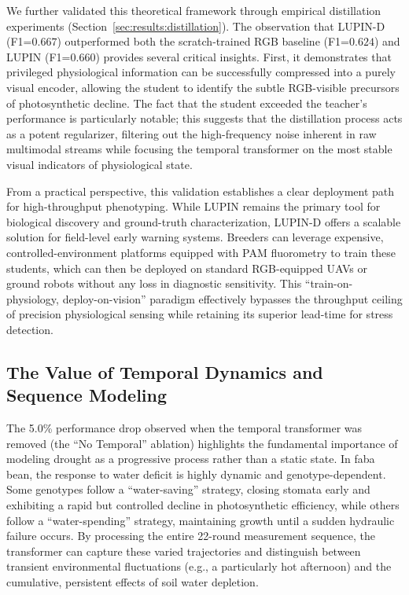 \documentclass[a4paper,fleqn]{cas-dc}
\begin{document}
We further validated this theoretical framework through empirical distillation experiments (Section~\ref{sec:results:distillation}). The observation that LUPIN-D (F1=$0.667$) outperformed both the scratch-trained RGB baseline (F1=$0.624$) and LUPIN (F1=$0.660$) provides several critical insights. First, it demonstrates that privileged physiological information can be successfully compressed into a purely visual encoder, allowing the student to identify the subtle RGB-visible precursors of photosynthetic decline. The fact that the student exceeded the teacher's performance is particularly notable; this suggests that the distillation process acts as a potent regularizer, filtering out the high-frequency noise inherent in raw multimodal streams while focusing the temporal transformer on the most stable visual indicators of physiological state.

From a practical perspective, this validation establishes a clear deployment path for high-throughput phenotyping. While LUPIN remains the primary tool for biological discovery and ground-truth characterization, LUPIN-D offers a scalable solution for field-level early warning systems. Breeders can leverage expensive, controlled-environment platforms equipped with PAM fluorometry to train these students, which can then be deployed on standard RGB-equipped UAVs or ground robots without any loss in diagnostic sensitivity. This ``train-on-physiology, deploy-on-vision'' paradigm effectively bypasses the throughput ceiling of precision physiological sensing while retaining its superior lead-time for stress detection.

\subsection{The Value of Temporal Dynamics and Sequence Modeling}\label{sec:discussion:temporal}

The 5.0\% performance drop observed when the temporal transformer was removed (the ``No Temporal'' ablation) highlights the fundamental importance of modeling drought as a progressive process rather than a static state. In faba bean, the response to water deficit is highly dynamic and genotype-dependent. Some genotypes follow a ``water-saving'' strategy, closing stomata early and exhibiting a rapid but controlled decline in photosynthetic efficiency, while others follow a ``water-spending'' strategy, maintaining growth until a sudden hydraulic failure occurs. By processing the entire 22-round measurement sequence, the transformer can capture these varied trajectories and distinguish between transient environmental fluctuations (e.g., a particularly hot afternoon) and the cumulative, persistent effects of soil water depletion.
\end{document}
